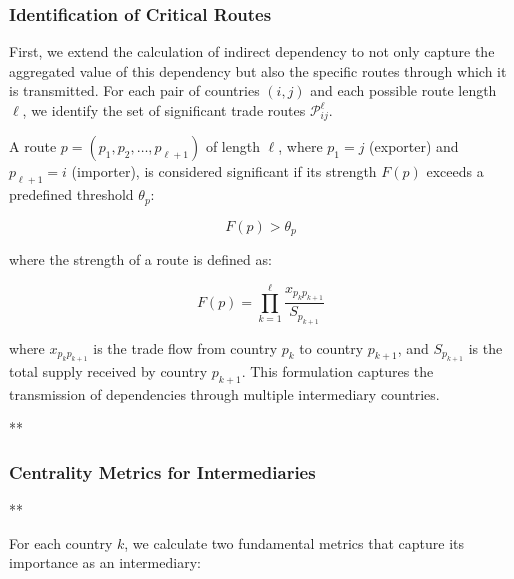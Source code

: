 \documentclass[final,1p,times,authoryear]{elsarticle}
\begin{document}
\subsubsection{Identification of Critical Routes}

First, we extend the calculation of indirect dependency to not only capture the aggregated value of this dependency but also the specific routes through which it is transmitted. For each pair of countries $(i,j)$ and each possible route length $\ell$, we identify the set of significant trade routes $\mathcal{P}_{ij}^{\ell}$.

A route $p = (p_1, p_2, \ldots, p_{\ell+1})$ of length $\ell$, where $p_1 = j$ (exporter) and $p_{\ell+1} = i$ (importer), is considered significant if its strength $F(p)$ exceeds a predefined threshold $\theta_p$:

\begin{equation}
F(p) > \theta_p
\end{equation}

where the strength of a route is defined as:

\begin{equation}
F(p) = \prod_{k=1}^{\ell} \frac{x_{p_k p_{k+1}}}{S_{p_{k+1}}}
\end{equation}

where $x_{p_k p_{k+1}}$ is the trade flow from country $p_k$ to country $p_{k+1}$, and $S_{p_{k+1}}$ is the total supply received by country $p_{k+1}$. This formulation captures the transmission of dependencies through multiple intermediary countries.

**\subsubsection{Centrality Metrics for Intermediaries}**

For each country $k$, we calculate two fundamental metrics that capture its importance as an intermediary:
\end{document}
